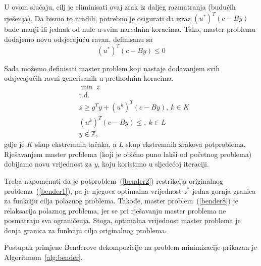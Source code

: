 \documentclass[a4paper, utf8, 11pt, colorlinks]{book}
\theoremstyle{definition}
\begin{document}


U ovom slučaju, cilj je eliminisati ovaj zrak iz daljeg razmatranja (budućih rješenja). Da bismo to uradili, potrebno je osigurati da izraz $(u^*)^T(c-By)$ bude manji ili jednak od nule u svim narednim koracima. Tako, master problemu dodajemo novu odsjecajuću ravan, definisanu sa
\begin{equation}
	\label{bender7}
	(u^*)^T(c-By)\leqslant 0
\end{equation}
 
Sada možemo definisati master problem koji nastaje dodavanjem svih odsjecajućih ravni generisanih u prethodnim koracima.
  \begin{equation}
	\begin{aligned}\label{bender8}
		&\min\ z\\
		&\mbox{t.d.} \\
		&z \geq g^Ty+(u^k)^T(c-By) , \ k \in K\\
		& (u^k)^T(c-By) \leq, \ k \in L\\
		&y \in \mathbb{Z},
	\end{aligned}
\end{equation}
 gdje je $K$ skup ekstremnih tačaka, a $L$ skup ekstremnih zrakova potproblema. Rješavanjem master problema (koji je obično puno lakši od početnog problema) dobijamo novu vrijednost za $y$, koju koristimo u sljedećoj iteraciji.
 
 Treba napomenuti da je potproblem~(\ref{bender2}) restrikcija originalnog problema~(\ref{bender1}), pa je njegova optimalna vrijednost $z^*$ jedna gornja granica za funkciju cilja polaznog problema. Takođe, master problem~(\ref{bender8}) je relaksacija polaznog problema, jer se pri rješavanju master problema ne posmatraju sva ograničenja. Stoga, optimalna vrijednost master problema je donja granica za funkciju cilja originalnog problema.
 
 Postupak primjene Benderove dekompozicije na problem minimizacije prikazan je Algoritmom~\ref{alg:bender}.

 
 
\end{document}
